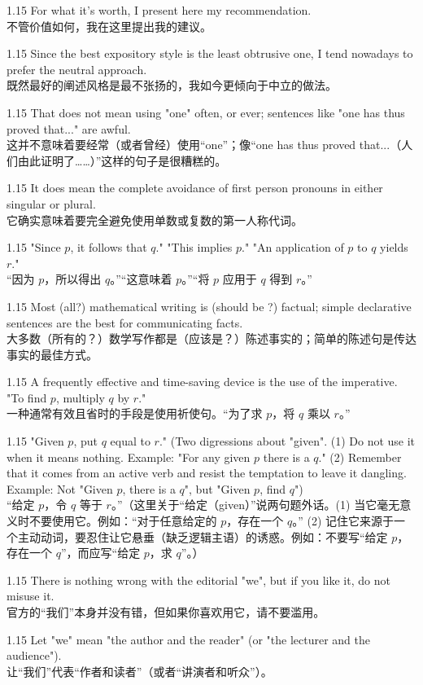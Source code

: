 \documentclass[12pt,a4paper]{article}
\newcommand{\bilingual}[2]{
    \begin{spacing}{1.15} %
        \noindent \normalsize #1 \\[-0.5ex] %
        \small \textcolor{blue!70!black}{#2} %
    \end{spacing}
    \vspace{0.8em} %
}
\begin{document}
\bilingual{For what it's worth, I present here my recommendation.}
{不管价值如何，我在这里提出我的建议。} %

\bilingual{Since the best expository style is the least obtrusive one, I tend nowadays to prefer the neutral approach.}
{既然最好的阐述风格是最不张扬的，我如今更倾向于中立的做法。} %

\bilingual{That does not mean using "one" often, or ever; sentences like "one has thus proved that..." are awful.}
{这并不意味着要经常（或者曾经）使用“one”；像“one has thus proved that...（人们由此证明了……）”这样的句子是很糟糕的。} %

\bilingual{It does mean the complete avoidance of first person pronouns in either singular or plural.}
{它确实意味着要完全避免使用单数或复数的第一人称代词。} %

\bilingual{"Since $p$, it follows that $q$." "This implies $p$." "An application of $p$ to $q$ yields $r$."}
{“因为 $p$，所以得出 $q$。”“这意味着 $p$。”“将 $p$ 应用于 $q$ 得到 $r$。”} %

\bilingual{Most (all?) mathematical writing is (should be ?) factual; simple declarative sentences are the best for communicating facts.}
{大多数（所有的？）数学写作都是（应该是？）陈述事实的；简单的陈述句是传达事实的最佳方式。} %

\bilingual{A frequently effective and time-saving device is the use of the imperative. "To find $p$, multiply $q$ by $r$."}
{一种通常有效且省时的手段是使用祈使句。“为了求 $p$，将 $q$ 乘以 $r$。”} %

\bilingual{"Given $p$, put $q$ equal to $r$." (Two digressions about "given". (1) Do not use it when it means nothing. Example: "For any given $p$ there is a $q$." (2) Remember that it comes from an active verb and resist the temptation to leave it dangling. Example: Not "Given $p$, there is a $q$", but "Given $p$, find $q$")}
{“给定 $p$，令 $q$ 等于 $r$。”（这里关于“给定（given）”说两句题外话。(1) 当它毫无意义时不要使用它。例如：“对于任意给定的 $p$，存在一个 $q$。” (2) 记住它来源于一个主动动词，要忍住让它悬垂（缺乏逻辑主语）的诱惑。例如：不要写“给定 $p$，存在一个 $q$”，而应写“给定 $p$，求 $q$”。）} %

\bilingual{There is nothing wrong with the editorial "we", but if you like it, do not misuse it.}
{官方的“我们”本身并没有错，但如果你喜欢用它，请不要滥用。} %

\bilingual{Let "we" mean "the author and the reader" (or "the lecturer and the audience").}
{让“我们”代表“作者和读者”（或者“讲演者和听众”）。} %
\end{document}
